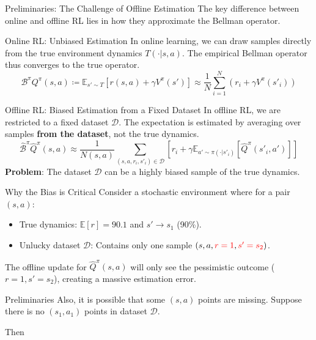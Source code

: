 \documentclass[11pt]{beamer}
\newcommand{\mc}[1]{\mathcal{#1}}
\begin{document}
\begin{frame}{Preliminaries: The Challenge of Offline Estimation}
    The key difference between online and offline RL lies in how they approximate the Bellman operator.
    
    \begin{block}{Online RL: Unbiased Estimation}
        In online learning, we can draw samples directly from the true environment dynamics $T(\cdot|s,a)$. The empirical Bellman operator thus converges to the true operator.
        \[
            \mathcal{B}^\pi Q^\pi (s,a) \coloneqq \mathbb{E}_{s' \sim T} \left[r(s,a) + \gamma V^\pi(s')\right] \approx \frac{1}{N}\sum_{i=1}^{N} \left( r_i + \gamma V^\pi(s'_i) \right)
        \]
    \end{block}

    \begin{block}{Offline RL: Biased Estimation from a Fixed Dataset}
        In offline RL, we are restricted to a fixed dataset $\mathcal{D}$. The expectation is estimated by averaging over samples \textbf{from the dataset}, not the true dynamics.
        \[
            \hat{\mathcal{B}}^\pi \hat{Q}^\pi (s,a) \approx \frac{1}{N(s,a)} \sum_{(s,a,r_i,s'_i) \in \mathcal{D}} \left[ r_i + \gamma \mathbb{E}_{a' \sim \pi(\cdot|s'_i)} [\hat{Q}^\pi (s'_{i}, a')] \right]
        \]
        \textbf{Problem}: The dataset $\mathcal{D}$ can be a highly biased sample of the true dynamics.
    \end{block}
    
    \begin{exampleblock}{Why the Bias is Critical}
        Consider a stochastic environment where for a pair $(s,a)$:
        \begin{itemize}
            \item True dynamics: $\mathbb{E}[r] = 90.1$ and $s' \to s_1$ (90\%).
            \item Unlucky dataset $\mathcal{D}$: Contains only one sample $(s, a, \textcolor{red}{r=1}, \textcolor{red}{s'=s_2})$.
        \end{itemize}
        The offline update for $\hat{Q}^\pi(s,a)$ will only see the pessimistic outcome ($r=1, s'=s_2$), creating a massive estimation error.
    \end{exampleblock}
\end{frame}

\begin{frame}{Preliminaries}
    Also, it is possible that some $(s,a)$ points are missing.
    Suppose there is no $(s_1, a_1)$ points in dataset $\mc{D}$.

    Then 

\end{frame}
\end{document}
